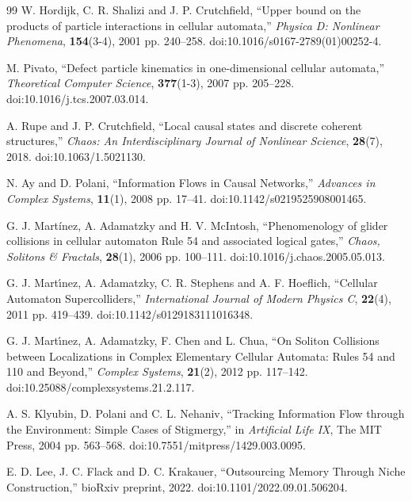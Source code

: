 \documentclass{article}
\begin{document}
\begin{thebibliography}{99}
W. Hordijk, C. R. Shalizi and J. P. Crutchfield, ``Upper bound on the products of particle interactions in cellular automata,'' \textit{Physica D: Nonlinear Phenomena}, \textbf{154}(3-4), 2001 pp. 240--258. doi:10.1016/s0167-2789(01)00252-4.

M. Pivato, ``Defect particle kinematics in one-dimensional cellular automata,'' \textit{Theoretical Computer Science}, \textbf{377}(1-3), 2007 pp. 205--228. doi:10.1016/j.tcs.2007.03.014.

A. Rupe and J. P. Crutchfield, ``Local causal states and discrete coherent structures,'' \textit{Chaos: An Interdisciplinary Journal of Nonlinear Science}, \textbf{28}(7), 2018. doi:10.1063/1.5021130.

N. Ay and D. Polani, ``Information Flows in Causal Networks,'' \textit{Advances in Complex Systems}, \textbf{11}(1), 2008 pp. 17--41. doi:10.1142/s0219525908001465.

G. J. Martínez, A. Adamatzky and H. V. McIntosh, ``Phenomenology of glider collisions in cellular automaton Rule 54 and associated logical gates,'' \textit{Chaos, Solitons \& Fractals}, \textbf{28}(1), 2006 pp. 100--111. doi:10.1016/j.chaos.2005.05.013.

G. J. Mart\'{\i}nez, A. Adamatzky, C. R. Stephens and A. F. Hoeflich, ``Cellular Automaton Supercolliders,'' \textit{International Journal of Modern Physics C}, \textbf{22}(4), 2011 pp. 419--439. doi:10.1142/s0129183111016348.

G. J. Mart\'{\i}nez, A. Adamatzky, F. Chen and L. Chua, ``On Soliton Collisions between Localizations in Complex Elementary Cellular Automata: Rules 54 and 110 and Beyond,'' \textit{Complex Systems}, \textbf{21}(2), 2012 pp. 117--142. doi:10.25088/complexsystems.21.2.117.

A. S. Klyubin, D. Polani and C. L. Nehaniv, ``Tracking Information Flow through the Environment: Simple Cases of Stigmergy,'' in \textit{Artificial Life IX}, The MIT Press, 2004 pp. 563--568. doi:10.7551/mitpress/1429.003.0095.

E. D. Lee, J. C. Flack and D. C. Krakauer, ``Outsourcing Memory Through Niche Construction,'' bioRxiv preprint, 2022. doi:10.1101/2022.09.01.506204.
\end{thebibliography}
\end{document}
